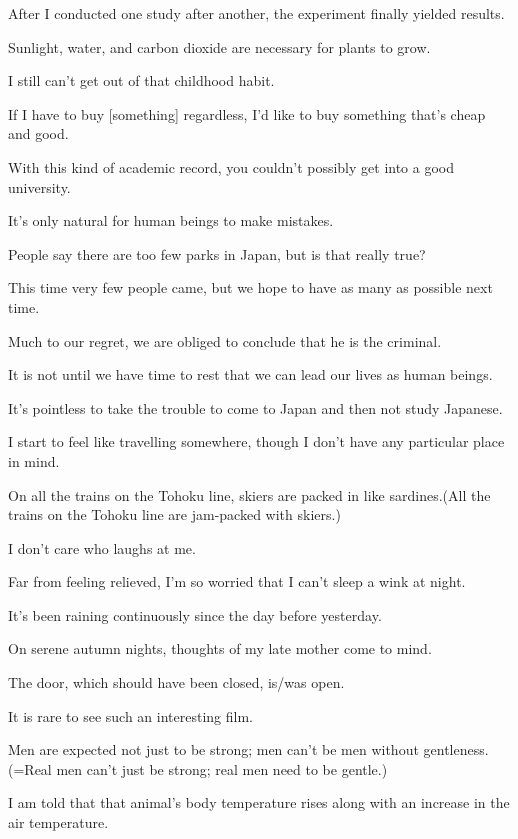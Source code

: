 \item[22.] After I conducted one study after another, the experiment finally yielded results.
\item[23.] Sunlight, water, and carbon dioxide are necessary for plants to grow.
\item[24.] I still can't get out of that childhood habit.
\item[25.] If I have to buy [something] regardless, I'd like to buy something that's cheap and good.
\item[26.] With this kind of academic record, you couldn't possibly get into a good university.
\item[27.] It's only natural for human beings to make mistakes.
\item[28.] People say there are too few parks in Japan, but is that really true?
\item[29.] This time very few people came, but we hope to have as many as possible next time.
\item[30.] Much to our regret, we are obliged to conclude that he is the criminal.
\item[31.] It is not until we have time to rest that we can lead our lives as human beings.
\item[32.] It's pointless to take the trouble to come to Japan and then not study Japanese.
\item[33.] I start to feel like travelling somewhere, though I don't have any particular place in mind.
\item[34.] On all the trains on the Tohoku line, skiers are packed in like sardines.(All the trains on the Tohoku line are jam-packed with skiers.)
\item[35.] I don't care who laughs at me.
\item[36.] Far from feeling relieved, I'm so worried that I can't sleep a wink at night.
\item[37.] It's been raining continuously since the day before yesterday.
\item[38.] On serene autumn nights, thoughts of my late mother come to mind.
\item[39.] The door, which should have been closed, is/was open.
\item[40.] It is rare to see such an interesting film.
\item[41.] Men are expected not just to be strong; men can't be men without gentleness.(=Real men can't just be strong; real men need to be gentle.)
\item[42.] I am told that that animal's body temperature rises along with an increase in the air temperature.
